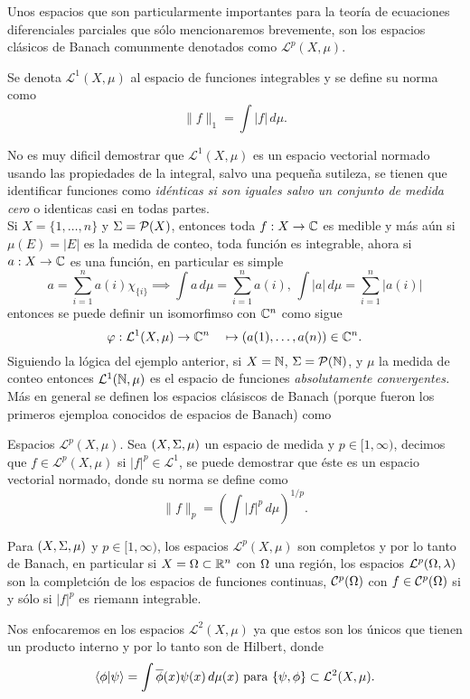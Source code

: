 \documentclass[main.tex]{subfiles}
\begin{document}
\noindent Unos espacios que son particularmente importantes para la teoría de ecuaciones diferenciales parciales que sólo mencionaremos brevemente, son los espacios clásicos de Banach comunmente denotados como $\mathcal{L}^p(X,\mu)$.
\begin{def.}
  Se denota $\mathcal{L}^1(X,\mu)$ al espacio de funciones integrables y se define su norma como
\[
  \|f\|_1=\int|f|\,d\mu.
\]
  \end{def.}
\obs No es muy dificil demostrar que $\mathcal{L}^1(X,\mu)$ es un espacio vectorial normado usando las propiedades de la integral, salvo una pequeña sutileza, se tienen que identificar funciones como \emph{idénticas si son iguales salvo un conjunto de medida cero} o identicas casi en todas partes.\\
\eje Si $X=\{1,\dots,n\}$ y $\Sigma=\mathcal{P}(X)$, entonces toda $f:X\to\mathbb C $ es medible y más aún si $\mu(E)=|E|$ es la medida de conteo, toda función es integrable, ahora si $a:X\to\mathbb C $ es una función, en particular es simple
\[
 a=\sum^n_{i=1}a(i)\chi_{\{i\}}\implies\int a\,d\mu=\sum^n_{i=1}a(i),\,\int |a|\,d\mu=\sum^n_{i=1}|a(i)|
 \]
entonces se puede definir un isomorfimso con $\mathbb{C}^n$ como sigue
\[
\varphi:\mathcal{L}^1(X,\mu)\to\mathbb{C}^n\quad\mapsto(a(1),\dots,a(n))\in\mathbb{C}^n.
\]
\eje Siguiendo la lógica del ejemplo anterior, si $X= \mathbb N $, $\Sigma=\mathcal{P}( \mathbb N )$, y $\mu$ la medida de conteo entonces $\mathcal{L}^1( \mathbb N ,\mu)$ es el espacio de funciones \emph{absolutamente convergentes.}\\
Más en general se definen los espacios clásiscos de Banach (porque fueron los primeros ejemploa conocidos de espacios de Banach) como
\begin{def.}{Espacios $\mathcal{L}^p(X,\mu)$.} Sea $(X,\Sigma,\mu)$ un espacio de medida y $p\in[1,\infty)$, decimos que $f\in\mathcal{L}^p(X,\mu)$ si $|f|^p\in\mathcal{L}^1$, se puede demostrar que éste es un espacio vectorial normado, donde su norma se define como
\[
\|f\|_p = \left(\int |f|^p \, d\mu\right)^{1/p}.
\]
\end{def.}
\begin{teorema}
  Para $(X,\Sigma,\mu)$ y $p\in[1,\infty)$, los espacios $\mathcal{L}^p(X,\mu)$ son completos y por lo tanto de Banach, en particular si $X=\Omega\subset\mathbb R ^n$ con $\Omega$ una región, los espacios $\mathcal{L}^p(\Omega,\lambda)$ son la completción de los espacios de funciones continuas, $\mathcal{C}^{p}(\Omega)$ con $f\in\mathcal{C}^{p}(\Omega)$ si y sólo si $|f|^p$ es riemann integrable.
  \end{teorema}
\obs Nos enfocaremos en los espacios $\mathcal{L}^2(X,\mu)$ ya que estos son los únicos que tienen un producto interno y por lo tanto son de Hilbert, donde
\[
\braket{\phi|\psi}=\int\overline{\phi}(x)\psi(x)\,d\mu(x)\text{ para }\{\psi,\phi\}\subset\mathcal{L}^2(X,\mu).
\]
\end{document}
